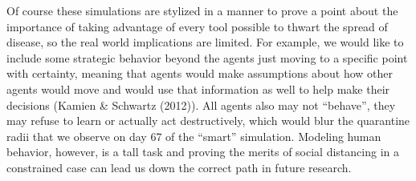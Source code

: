 \documentclass[twoside]{extarticle}                                    %
\numberwithin{equation}{section}                                       %
\begin{document}
Of course these simulations are stylized in a manner to prove a point about the importance of taking advantage of every tool possible to thwart the spread of disease, so the real world implications are limited. For example, we would like to include some strategic behavior beyond the agents just moving to a specific point with certainty, meaning that agents would make assumptions about how other agents would move and would use that information as well to help make their decisions (Kamien \& Schwartz (2012)). All agents also may not ``behave'', they may refuse to learn or actually act destructively, which would blur the quarantine radii that we observe on day 67 of the ``smart'' simulation. Modeling human behavior, however, is a tall task and proving the merits of social distancing in a constrained case can lead us down the correct path in future research.
\end{document}

